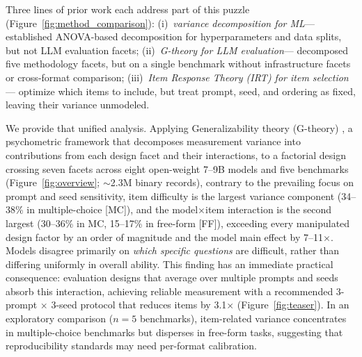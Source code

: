 Three lines of prior work each address part of this puzzle (Figure~\ref{fig:method_comparison}): (i)~\emph{variance decomposition for ML}---\citet{bouthillier2021accounting} established ANOVA-based decomposition for hyperparameters and data splits, but not LLM evaluation facets; (ii)~\emph{G-theory for LLM evaluation}---\citet{messing2026hidden} decomposed five methodology facets, but on a single benchmark without infrastructure facets or cross-format comparison; (iii)~\emph{Item Response Theory (IRT) for item selection}---\citet{polo2024tinybenchmarks, lalor2019irt, zhou2026irt} optimize which items to include, but treat prompt, seed, and ordering as fixed, leaving their variance unmodeled.

We provide that unified analysis. Applying Generalizability theory (G-theory) \citep{shavelson1991generalizability, brennan2001generalizability}, a psychometric framework that decomposes measurement variance into contributions from each design facet and their interactions, to a factorial design crossing seven facets across eight open-weight 7--9B models and five benchmarks (Figure~\ref{fig:overview}; ${\sim}$2.3M binary records), contrary to the prevailing focus on prompt and seed sensitivity, item difficulty is the largest variance component (34--38\% in multiple-choice [MC]), and the model$\times$item interaction is the second largest (30--36\% in MC, 15--17\% in free-form [FF]), exceeding every manipulated design factor by an order of magnitude and the model main effect by 7--11$\times$. Models disagree primarily on \emph{which specific questions} are difficult, rather than differing uniformly in overall ability. This finding has an immediate practical consequence: evaluation designs that average over multiple prompts and seeds absorb this interaction, achieving reliable measurement with a recommended 3-prompt $\times$ 3-seed protocol that reduces items by 3.1$\times$ (Figure~\ref{fig:teaser}). In an exploratory comparison ($n = 5$ benchmarks), item-related variance concentrates in multiple-choice benchmarks but disperses in free-form tasks, suggesting that reproducibility standards may need per-format calibration.

